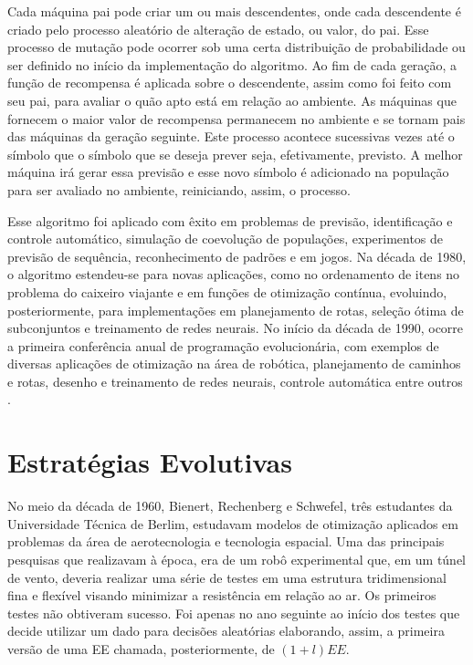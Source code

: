 Cada máquina pai pode criar um ou mais descendentes, onde cada descendente é criado pelo processo aleatório de alteração de estado, ou valor, do pai. Esse processo de mutação pode ocorrer sob uma certa distribuição de probabilidade ou ser definido no início da implementação do algoritmo. Ao fim de cada geração, a função de recompensa é aplicada sobre o descendente, assim como foi feito com seu pai, para avaliar o quão apto está em relação ao ambiente. As máquinas que fornecem o maior valor de recompensa permanecem no ambiente e se tornam pais das máquinas da geração seguinte. Este processo acontece sucessivas vezes até o símbolo que o símbolo que se deseja prever seja, efetivamente, previsto. A melhor máquina irá gerar essa previsão e esse novo símbolo é adicionado na população para ser avaliado no ambiente, reiniciando, assim, o processo.

Esse algoritmo foi aplicado com êxito em problemas de previsão, identificação e controle automático, simulação de coevolução de populações, experimentos de previsão de sequência, reconhecimento de padrões e em jogos. Na década de 1980, o algoritmo estendeu-se para novas aplicações, como no ordenamento de itens no problema do caixeiro viajante e em funções de otimização contínua, evoluindo, posteriormente, para implementações em planejamento de rotas, seleção ótima de subconjuntos e treinamento de redes neurais. No início da década de 1990, ocorre a primeira conferência anual de programação evolucionária, com exemplos de diversas aplicações de otimização na área de robótica, planejamento de caminhos e rotas, desenho e treinamento de redes neurais, controle automática entre outros .

\section{Estratégias Evolutivas} 

No meio da década de 1960, Bienert, Rechenberg e Schwefel, três estudantes da Universidade Técnica de Berlim, estudavam modelos de otimização aplicados em problemas da área de aerotecnologia e tecnologia espacial. Uma das principais pesquisas que realizavam à época, era de um robô experimental que, em um túnel de vento, deveria realizar uma série de testes em uma estrutura tridimensional fina e flexível visando minimizar a resistência em relação ao ar. Os primeiros testes não obtiveram sucesso. Foi apenas no ano seguinte ao início dos testes que \cite{rechenberg_cybernetic_1965} decide utilizar um dado para decisões aleatórias elaborando, assim, a primeira versão de uma EE \cite[pg.A2.3:6]{back_handbook_1997} chamada, posteriormente, de $(1 + l) EE$. 

